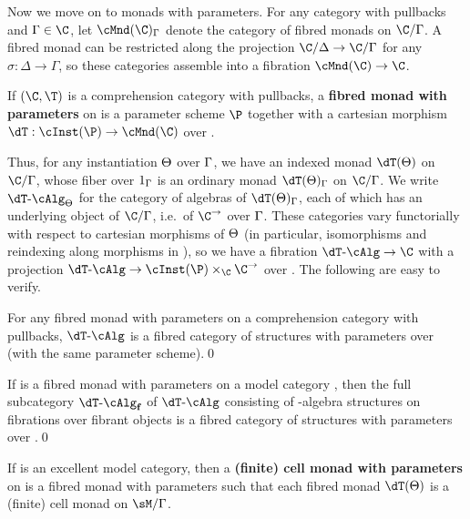 \begin{enumerate}
\begin{enumerate}
Now we move on to monads with parameters.
For any category \C with pullbacks and $\Gamma\in\C$, let $\cMnd(\C)_\Gamma$ denote the category of fibred monads on $\C/\Gamma$.
A fibred monad can be restricted along the projection $\C/\Delta\to\C/\Gamma$ for any $\sigma:\Delta\to\Gamma$, so these categories assemble into a fibration $\cMnd(\C) \to \C$.

\begin{defn}
  If $(\C,\T)$ is a comprehension category with pullbacks, a \textbf{fibred monad with parameters} on \C is a parameter scheme $\P$ together with a cartesian morphism $\dT:\cInst(\P) \to \cMnd(\C)$ over \C.
\end{defn}

Thus, for any instantiation $\Theta$ over $\Gamma$, we have an indexed monad $\dT(\Th)$ on $\C/\Gm$, whose fiber over $1_\Gamma$ is an ordinary monad $\dT(\Th)_\Gm$ on $\C/\Gm$.
We write $\dT\alg_{\Th}$ for the category of algebras of $\dT(\Th)_\Gm$, each of which has an underlying object of $\C/\Gamma$, i.e.\ of $\C^\to$ over $\Gamma$.
These categories vary functorially with respect to cartesian morphisms of $\Theta$ (in particular, isomorphisms and reindexing along morphisms in \C), so we have a fibration $\dT\alg \to \C$ with a projection $\dT\alg \to \cInst(\P)\times_\C \C^\to$ over \C.
The following are easy to verify.

\begin{lem}
  For any fibred monad with parameters \dT on a comprehension category \C with pullbacks, $\dT\alg$ is a fibred category of structures with parameters over \C (with the same parameter scheme).\qed
\end{lem}

\begin{lem}
  If \dT is a fibred monad with parameters on a model category \sM, then the full subcategory $\dT\algf$ of $\dT\alg$ consisting of \dT-algebra structures on fibrations over fibrant objects is a fibred category of structures with parameters over \Mf.\qed
\end{lem}

\begin{defn}\label{defn:cell-param}
  If \sM is an excellent model category, then a \textbf{(finite) cell monad with parameters} on \sM is a fibred monad with parameters such that each fibred monad $\dT(\Th)$ is a (finite) cell monad on $\sM/\Gamma$.
\end{defn}


\end{enumerate}
\end{enumerate}
